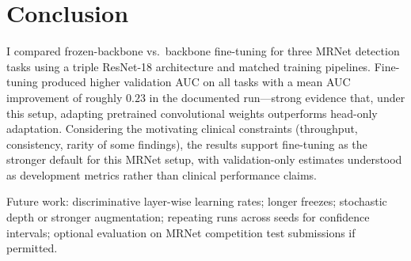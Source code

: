 \documentclass[10pt,twocolumn]{article}
\begin{document}
\section{Conclusion}
\label{sec:conclusion}

I compared frozen-backbone vs.\ backbone fine-tuning for three MRNet detection tasks using a triple ResNet-18 architecture and matched training pipelines. Fine-tuning produced higher validation AUC on all tasks with a mean AUC improvement of roughly $0.23$ in the documented run---strong evidence that, under this setup, adapting pretrained convolutional weights outperforms head-only adaptation. Considering the motivating clinical constraints (throughput, consistency, rarity of some findings), the results support fine-tuning as the stronger default for this MRNet setup, with validation-only estimates understood as development metrics rather than clinical performance claims.

Future work: discriminative layer-wise learning rates; longer freezes; stochastic depth or stronger augmentation; repeating runs across seeds for confidence intervals; optional evaluation on MRNet competition test submissions if permitted.
\end{document}
